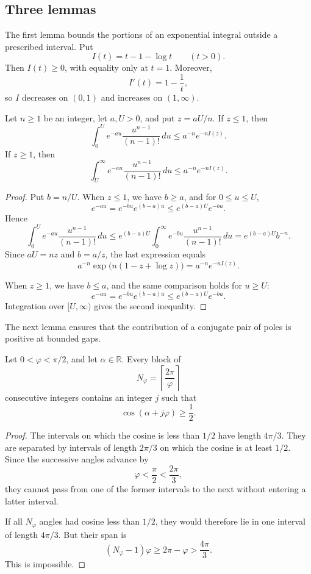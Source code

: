 \subsection{Three lemmas}\label{subsec:lemmas}

The first lemma bounds the portions of an exponential integral outside a prescribed interval. Put
\[
I(t)=t-1-\log t
\qquad(t>0).
\]
Then $I(t)\geq 0$, with equality only at $t=1$. Moreover,
\[
I'(t)=1-\frac1t,
\]
so $I$ decreases on $(0,1)$ and increases on $(1,\infty)$.

\begin{lemma}\label{thm:exponential-tails}
Let $n\geq 1$ be an integer, let $a,U>0$, and put $z=aU/n$. If $z\leq 1$, then
\[
\int_0^U e^{-au}\frac{u^{n-1}}{(n-1)!}\,du
\leq
a^{-n}e^{-nI(z)}.
\]
If $z\geq 1$, then
\[
\int_U^\infty e^{-au}\frac{u^{n-1}}{(n-1)!}\,du
\leq
a^{-n}e^{-nI(z)}.
\]
\end{lemma}

\begin{proof}
Put $b=n/U$. When $z\leq 1$, we have $b\geq a$, and for $0\leq u\leq U$,
\[
e^{-au}
=
e^{-bu}e^{(b-a)u}
\leq
e^{(b-a)U}e^{-bu}.
\]
Hence
\[
\int_0^U e^{-au}\frac{u^{n-1}}{(n-1)!}\,du
\leq
e^{(b-a)U}
\int_0^\infty e^{-bu}\frac{u^{n-1}}{(n-1)!}\,du
=
e^{(b-a)U}b^{-n}.
\]
Since $aU=nz$ and $b=a/z$, the last expression equals
\[
a^{-n}\exp\!\bigl(n(1-z+\log z)\bigr)
=
a^{-n}e^{-nI(z)}.
\]

When $z\geq 1$, we have $b\leq a$, and the same comparison holds for $u\geq U$:
\[
e^{-au}
=
e^{-bu}e^{(b-a)u}
\leq
e^{(b-a)U}e^{-bu}.
\]
Integration over $[U,\infty)$ gives the second inequality.
\end{proof}

The next lemma ensures that the contribution of a conjugate pair of poles is positive at bounded gaps.

\begin{lemma}\label{thm:cosine-blocks}
Let $0<\varphi<\pi/2$, and let $\alpha\in\mathbb R$. Every block of
\[
N_\varphi=\left\lceil\frac{2\pi}{\varphi}\right\rceil
\]
consecutive integers contains an integer $j$ such that
\[
\cos(\alpha+j\varphi)\geq \frac12.
\]
\end{lemma}

\begin{proof}
The intervals on which the cosine is less than $1/2$ have length $4\pi/3$. They are separated by intervals of length $2\pi/3$ on which the cosine is at least $1/2$. Since the successive angles advance by
\[
\varphi<\frac{\pi}{2}<\frac{2\pi}{3},
\]
they cannot pass from one of the former intervals to the next without entering a latter interval.

If all $N_\varphi$ angles had cosine less than $1/2$, they would therefore lie in one interval of length $4\pi/3$. But their span is
\[
(N_\varphi-1)\varphi
\geq 2\pi-\varphi
>
\frac{4\pi}{3}.
\]
This is impossible.
\end{proof}

